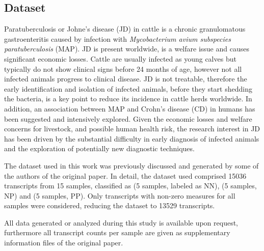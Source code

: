 \documentclass{standalone}
\begin{document}
\subsection[Dataset]{Dataset}\label{bovine:bovine_data}

Paratuberculosis or Johne's disease (JD) in cattle is a chronic granulomatous gastroenteritis caused by infection with \emph{Mycobacterium avium subspecies paratuberculosis} (MAP).
JD is present worldwide, is a welfare issue and causes significant economic losses.
Cattle are usually infected as young calves but typically do not show clinical signs before 24 months of age, however not all infected animals progress to clinical disease.
JD is not treatable, therefore the early identification and isolation of infected animals, before they start shedding the bacteria, is a key point to reduce its incidence in cattle herds worldwide.
In addition, an association between MAP and Crohn's disease (CD) in humans has been suggested and intensively explored.
Given the economic losses and welfare concerns for livestock, and possible human health risk, the research interest in JD has been driven by the substantial difficulty in early diagnosis of infected animals and the exploration of potentially new diagnostic techniques.

The dataset used in this work was previously discussed and generated by some of the authors of the original paper.
In detail, the dataset used comprised 15036 transcripts from 15 samples, classified as  (5 samples, labeled as NN),  (5 samples, NP) and  (5 samples, PP).
Only transcripts with non-zero measures for all samples were considered, reducing the dataset to 13529 transcripts.

All data generated or analyzed during this study is available upon request, furthermore all transcript counts per sample are given as supplementary information files of the original paper.
\end{document}
